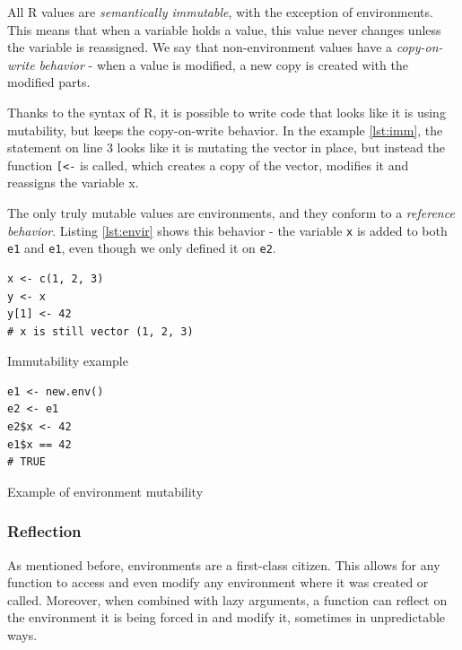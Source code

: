 All R values are \textit{semantically immutable}, with the exception of environments. This means that when a variable holds a value, this value never changes unless the variable is reassigned. We say that non-environment values have a \textit{copy-on-write behavior} - when a value is modified, a new copy is created with the modified parts.

Thanks to the syntax of R, it is possible to write code that looks like it is using mutability, but keeps the copy-on-write behavior. In the example \ref{lst:imm}, the statement on line 3 looks like it is mutating the vector in place, but instead the function \texttt{[<-} is called, which creates a copy of the vector, modifies it and reassigns the variable x.

The only truly mutable values are environments, and they conform to a \textit{reference behavior}. Listing \ref{lst:envir} shows this behavior - the variable \texttt{x} is added to both \texttt{e1} and \texttt{e1}, even though we only defined it on \texttt{e2}.

\begin{listing}
	\centering
	\begin{minipage}{0.47\textwidth}
		\begin{verbatim}
x <- c(1, 2, 3)
y <- x
y[1] <- 42
# x is still vector (1, 2, 3)
      \end{verbatim}
		\caption{Immutability example}\label{lst:imm}
	\end{minipage}
	\hfill
	\begin{minipage}{0.47\textwidth}
		\begin{verbatim}
e1 <- new.env()
e2 <- e1
e2$x <- 42
e1$x == 42
# TRUE
      \end{verbatim}
		\caption{Example of environment mutability}\label{lst:envir}
	\end{minipage}
\end{listing}

\subsubsection*{Reflection}

As mentioned before, environments are a first-class citizen. This allows for any function to access and even modify any environment where it was created or called. Moreover, when combined with lazy arguments, a function can reflect on the environment it is being forced in and modify it, sometimes in unpredictable ways.

